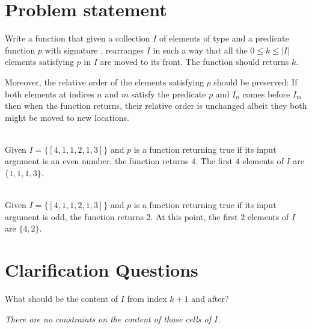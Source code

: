 \section{Problem statement}
\begin{exercise}
\label{example:remove_all_occurrences_unsorted_array_inplace:exercice1}
Write a function that given a collection $I$ of elements of type  and a predicate function
 $p$ with signature , rearranges $I$ in such a way that all the $0 \leq k
 \leq |I|$ elements satisfying $p$ in $I$ are moved to its front. The function should returns $k$.

 Moreover, the relative order of the elements  satisfying $p$ should be preserved: If both elements
 at indices $n$ and $m$ satisfy the predicate $p$  and $I_n$ comes before $I_m$ then when the
 function returns, their relative order is unchanged albeit they both might be moved to new
 locations.
 
	\begin{example}
		\label{example:remove_all_occurrences_unsorted_array_inplace:example1}
		\hfill \\
		Given $I = \{[4, 1, 1, 2, 1, 3]\}$ and $p$ is a function returning true if its input
		argument is an even number, the function returns $4$. The first $4$ elements of $I$ are
		$\{1,1,1,3\}$. 
		
	\end{example}

	\begin{example}
		\label{example:remove_all_occurrences_unsorted_array_inplace:example2}
		\hfill \\
		Given $I = \{[4, 1, 1, 2, 1, 3]\}$ and $p$ is a function returning true if its input
		argument is odd, the function returns $2$. At this point, the first $2$ elements of $I$ are
		$\{4,2\}$. 
		
	\end{example}
\end{exercise}

\section{Clarification Questions}

\begin{QandA}
	\item What should be the content of $I$ from index $k+1$ and after?
	\begin{answered}
		\textit{There are no constraints on the content of those cells of $I$.}
	\end{answered}
	
\end{QandA}

